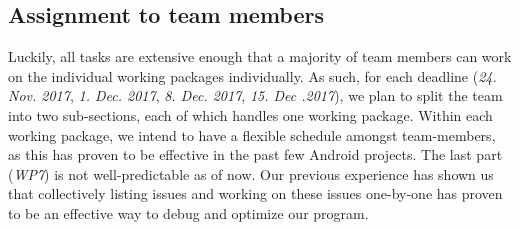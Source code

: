 \documentclass{report}
\begin{document}
\subsection{Assignment to team members}
Luckily, all tasks are extensive enough that a majority of team members can work on the individual working packages individually. 
As such, for each deadline (\textit{24. Nov. 2017}, \textit{1. Dec. 2017}, \textit{8. Dec. 2017}, \textit{15. Dec .2017}), we plan to split the team into two sub-sections, each of which handles one working package. Within each working package, we intend to have a flexible schedule amongst team-members, as this has proven to be effective in the past few Android projects. 
The last part (\textit{WP7}) is not well-predictable as of now. 
Our previous experience has shown us that collectively listing issues and working on these issues one-by-one has proven to be an effective way to debug and optimize our program.



\end{document}
